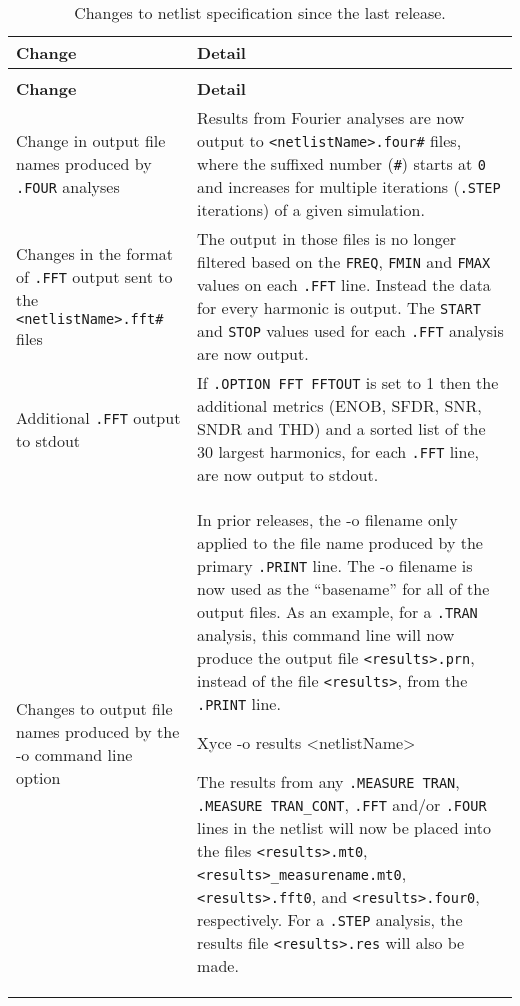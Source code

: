 {
\small

\begin{longtable}[h] {>{\raggedright\small}m{2in}|>{\raggedright\let\\\tabularnewline\small}m{3.5in}}
  \caption{Changes to netlist specification since the last release.\label{newUsage}} \\ \hline
  \rowcolor{XyceDarkBlue}
  \color{white}\textbf{Change} &
  \color{white}\textbf{Detail} \\ \hline \endfirsthead
  \caption[]{Changes to netlist specification since the last release.\label{newUsage}} \\ \hline
  \rowcolor{XyceDarkBlue}
  \color{white}\textbf{Change} &
  \color{white}\textbf{Detail} \\ \hline \endhead

Change in output file names produced by \texttt{.FOUR} analyses &
Results from Fourier analyses are now output to \texttt{<netlistName>.four\#} files,
where the suffixed number (\texttt{\#}) starts at \texttt{0} and increases for multiple
iterations (\texttt{.STEP} iterations) of a given simulation. \\ \hline

Changes in the format of \texttt{.FFT} output sent to the
\texttt{<netlistName>.fft\#} files  & The output in those
files is no longer filtered based on the \texttt{FREQ}, \texttt{FMIN} and
\texttt{FMAX} values on each \texttt{.FFT} line.  Instead the data for
every harmonic is output.  The \texttt{START} and \texttt{STOP} values
used for each \texttt{.FFT} analysis are now output. \\ \hline

Additional \texttt{.FFT} output to stdout & If \texttt{.OPTION FFT FFTOUT}
is set to 1 then the additional metrics (ENOB, SFDR, SNR, SNDR and THD)
and a sorted list of the 30 largest harmonics, for each \texttt{.FFT} line,
are now output to stdout. \\ \hline

Changes to output file names produced by the -o command line option &
In prior releases, the -o filename only applied to the file name
produced by the primary \texttt{.PRINT} line.  The -o filename is now
used as the ``basename'' for all of the output files. As an example,
for a \texttt{.TRAN} analysis, this command line will now produce the
output file \verb+<results>.prn+, instead of the file \verb+<results>+,
from the \texttt{.PRINT} line.
\begin{vquote}
   Xyce -o results <netlistName>
\end{vquote}

The results from any \texttt{.MEASURE TRAN}, \texttt{.MEASURE TRAN\_CONT},
\texttt{.FFT} and/or \texttt{.FOUR} lines in the netlist will now be placed into
the files \verb+<results>.mt0+, \verb+<results>_measurename.mt0+,
\verb+<results>.fft0+, and \verb+<results>.four0+, respectively.  For a
\texttt{.STEP} analysis, the results file \verb+<results>.res+ will also be
made.

\\ \hline

\end{longtable}
}
